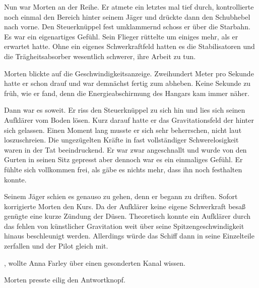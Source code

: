 \par

Nun war Morten an der Reihe. Er atmete ein letztes mal tief durch, kontrollierte noch einmal den Bereich hinter seinem Jäger und drückte dann den Schubhebel nach vorne. Den Steuerknüppel fest umklammernd schoss er über die Starbahn. Es war ein eigenartiges Gefühl. Sein Flieger rüttelte um einiges mehr, als er erwartet hatte. Ohne ein eigenes Schwerkraftfeld hatten es die Stabilisatoren und die Trägheitsabsorber wesentlich schwerer, ihre Arbeit zu tun.

\par

Morten blickte auf die Geschwindigkeitsanzeige. Zweihundert Meter pro Sekunde hatte er schon drauf und war demnächst fertig zum abheben. Keine Sekunde zu früh, wie er fand, denn die Energieabschirmung des Hangars kam immer näher.

\par

Dann war es soweit. Er riss den Steuerknüppel zu sich hin und lies sich seinen Aufklärer vom Boden lösen. Kurz darauf hatte er das Gravitationsfeld der  hinter sich gelassen. Einen Moment lang musste er sich sehr beherrschen, nicht laut loszuschreien. Die ungezügelten Kräfte in fast vollständiger Schwerelosigkeit waren in der Tat beeindruckend. Er war zwar angeschnallt und wurde von den Gurten in seinen Sitz gepresst aber dennoch war es ein einmaliges Gefühl. Er fühlte sich vollkommen frei, als gäbe es nichts mehr, dass ihn noch festhalten konnte.

\par

Seinem Jäger schien es genauso zu gehen, denn er begann zu driften. Sofort korrigierte Morten den Kurs. Da der Aufklärer keine eigene Schwerkraft besaß genügte eine kurze Zündung der Düsen. Theoretisch konnte ein Aufklärer durch das fehlen von künstlicher Gravitation weit über seine Spitzengeschwindigkeit hinaus beschleunigt werden. Allerdings würde das Schiff dann in seine Einzelteile zerfallen und der Pilot gleich mit.

\par

, wollte Anna Farley über einen gesonderten Kanal wissen.

\par

Morten presste eilig den Antwortknopf. 

